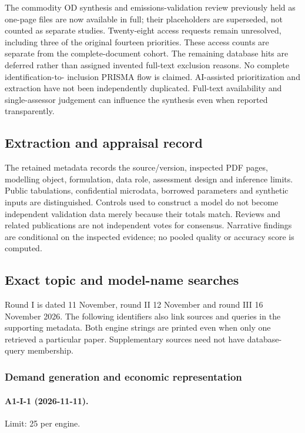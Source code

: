 The commodity OD synthesis and emissions-validation review previously held as
one-page files are now available in full; their placeholders are superseded,
not counted as separate studies. Twenty-eight access requests remain unresolved,
including three of the original fourteen priorities. These access counts are
separate from the complete-document cohort.
The remaining database hits are deferred rather than
assigned invented full-text exclusion reasons. No complete identification-to-
inclusion PRISMA flow is claimed. AI-assisted prioritization and extraction have
not been independently duplicated. Full-text availability and single-assessor
judgement can influence the synthesis even when reported transparently.

\subsection{Extraction and appraisal record}
The retained metadata records the source/version, inspected PDF pages, modelling
object, formulation, data role, assessment design and inference limits. Public
tabulations, confidential microdata, borrowed parameters and synthetic inputs
are distinguished. Controls used to construct a model do not become independent
validation data merely because their totals match. Reviews and related
publications are not independent votes for consensus. Narrative findings are
conditional on the inspected evidence; no pooled quality or accuracy score is
computed.

\subsection{Exact topic and model-name searches}
Round I is dated 11 November, round II 12 November and round III 16 November
2026. The following identifiers also link sources and queries in the supporting
metadata. Both engine strings are printed even when only one retrieved a
particular paper. Supplementary sources need not have database-query membership.


\subsubsection{Demand generation and economic representation}

\paragraph{A1-I-1 (2026-11-11).} Limit: 25 per engine.

